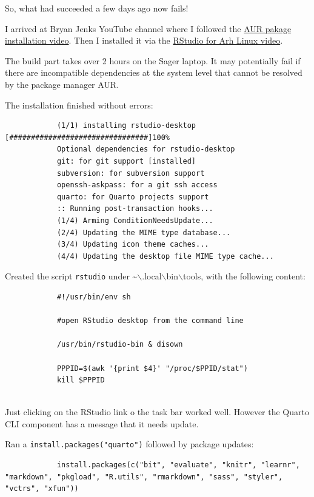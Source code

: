 \documentclass[]{scrartcl}
\begin{document}
	So, what had succeeded a few days ago now fails!
	
	I arrived at Bryan Jenks YouTube channel where I followed the \href{https://www.youtube.com/watch?v=FhvEJxrzABI}{AUR pakage installation
	video}. Then I installed it via the \href{https://www.youtube.com/watch?v=XAId0j7RR0c}{RStudio for Arh Linux video}.
	
	The build part takes over 2 hours on the Sager laptop. It may potentially fail if there are incompatible dependencies at the 
	system level that cannot be resolved by the package manager AUR.
	
	The installation finished without errors:
	
	\begin{small}
		\begin{verbatim}
			(1/1) installing rstudio-desktop             [################################]100%
			Optional dependencies for rstudio-desktop
			git: for git support [installed]
			subversion: for subversion support
			openssh-askpass: for a git ssh access
			quarto: for Quarto projects support
			:: Running post-transaction hooks...
			(1/4) Arming ConditionNeedsUpdate...
			(2/4) Updating the MIME type database...
			(3/4) Updating icon theme caches...
			(4/4) Updating the desktop file MIME type cache...
		\end{verbatim}
	\end{small}
	
	
	Created the script \texttt{rstudio} under \textasciitilde$\backslash$.local$\backslash$bin$\backslash$tools, with the following content:
	
	\begin{small}
		\begin{verbatim}
			#!/usr/bin/env sh
			
			#open RStudio desktop from the command line
			
			/usr/bin/rstudio-bin & disown
			
			PPPID=$(awk '{print $4}' "/proc/$PPID/stat")
			kill $PPPID
			
		\end{verbatim}
	\end{small}
	
	Just clicking on the RStudio link o the task bar worked well. However the Quarto CLI component
	has a message that it needs update.
	
	Ran a \texttt{install.packages("quarto")} followed by package updates:
	
	\begin{tiny}
		\begin{verbatim}
			install.packages(c("bit", "evaluate", "knitr", "learnr", "markdown", "pkgload", "R.utils", "rmarkdown", "sass", "styler", "vctrs", "xfun"))
		\end{verbatim}
	\end{tiny}
	
\end{document}
